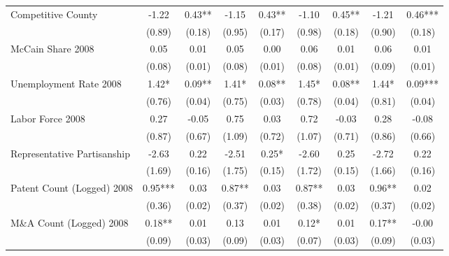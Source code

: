\begin{table}[!htbp]
\begin{tabular}{l*{8}{c}}
Competitive County  &       -1.22   &        0.43** &       -1.15   &        0.43** &       -1.10   &        0.45** &       -1.21   &        0.46***\\
                    &      (0.89)   &      (0.18)   &      (0.95)   &      (0.17)   &      (0.98)   &      (0.18)   &      (0.90)   &      (0.18)   \\
McCain Share 2008   &        0.05   &        0.01   &        0.05   &        0.00   &        0.06   &        0.01   &        0.06   &        0.01   \\
                    &      (0.08)   &      (0.01)   &      (0.08)   &      (0.01)   &      (0.08)   &      (0.01)   &      (0.09)   &      (0.01)   \\
Unemployment Rate 2008 &        1.42*  &        0.09** &        1.41*  &        0.08** &        1.45*  &        0.08** &        1.44*  &        0.09***\\
                    &      (0.76)   &      (0.04)   &      (0.75)   &      (0.03)   &      (0.78)   &      (0.04)   &      (0.81)   &      (0.04)   \\
Labor Force 2008    &        0.27   &       -0.05   &        0.75   &        0.03   &        0.72   &       -0.03   &        0.28   &       -0.08   \\
                    &      (0.87)   &      (0.67)   &      (1.09)   &      (0.72)   &      (1.07)   &      (0.71)   &      (0.86)   &      (0.66)   \\
Representative Partisanship&       -2.63   &        0.22   &       -2.51   &        0.25*  &       -2.60   &        0.25   &       -2.72   &        0.22   \\
                    &      (1.69)   &      (0.16)   &      (1.75)   &      (0.15)   &      (1.72)   &      (0.15)   &      (1.66)   &      (0.16)   \\
Patent Count (Logged) 2008&        0.95***&        0.03   &        0.87** &        0.03   &        0.87** &        0.03   &        0.96** &        0.02   \\
                    &      (0.36)   &      (0.02)   &      (0.37)   &      (0.02)   &      (0.38)   &      (0.02)   &      (0.37)   &      (0.02)   \\
M\&A Count (Logged) 2008&        0.18** &        0.01   &        0.13   &        0.01   &        0.12*  &        0.01   &        0.17** &       -0.00   \\
                    &      (0.09)   &      (0.03)   &      (0.09)   &      (0.03)   &      (0.07)   &      (0.03)   &      (0.09)   &      (0.03)   \\

\end{tabular}
\end{table}
